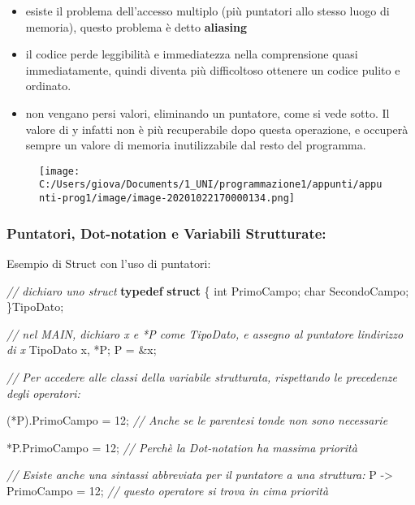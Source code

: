 \documentclass[
]{article}
\newenvironment{Shaded}{}{}
\newcommand{\CommentTok}[1]{\textcolor[rgb]{0.38,0.63,0.69}{\textit{#1}}}
\newcommand{\DataTypeTok}[1]{\textcolor[rgb]{0.56,0.13,0.00}{#1}}
\newcommand{\DecValTok}[1]{\textcolor[rgb]{0.25,0.63,0.44}{#1}}
\newcommand{\KeywordTok}[1]{\textcolor[rgb]{0.00,0.44,0.13}{\textbf{#1}}}
\newcommand{\NormalTok}[1]{#1}
\begin{document}
\begin{itemize}
\item
  esiste il problema dell'accesso multiplo (più puntatori allo stesso
  luogo di memoria), questo problema è detto \textbf{aliasing}
\item
  il codice perde leggibilità e immediatezza nella comprensione quasi
  immediatamente, quindi diventa più difficoltoso ottenere un codice
  pulito e ordinato.
\item
  non vengano persi valori, eliminando un puntatore, come si vede sotto.
  Il valore di y infatti non è più recuperabile dopo questa operazione,
  e occuperà sempre un valore di memoria inutilizzabile dal resto del
  programma.
\end{itemize}

\begin{figure}
\centering
\texttt{[image: C:/Users/giova/Documents/1\_UNI/programmazione1/appunti/appunti-prog1/image/image-20201022170000134.png]}
\caption{}
\end{figure}

\hypertarget{header-n691}{%
\subsubsection{Puntatori, Dot-notation e Variabili
Strutturate:}\label{header-n691}}

Esempio di Struct con l'uso di puntatori:

\begin{Shaded}
\begin{Highlighting}[]
\CommentTok{// dichiaro uno struct}
\KeywordTok{typedef} \KeywordTok{struct}\NormalTok{ \{}
	\DataTypeTok{int}\NormalTok{ PrimoCampo;}
	\DataTypeTok{char}\NormalTok{ SecondoCampo;}
\NormalTok{\}TipoDato;}

\CommentTok{// nel MAIN, dichiaro x e *P come TipoDato, e assegno al puntatore l\textquotesingle{}indirizzo di x}
\NormalTok{TipoDato x, *P;}
\NormalTok{P = \&x;}

\CommentTok{// Per accedere alle classi della variabile strutturata, rispettando le precedenze degli operatori:}

\NormalTok{(*P).PrimoCampo = }\DecValTok{12}\NormalTok{; }\CommentTok{// Anche se le parentesi tonde non sono necessarie}

\NormalTok{*P.PrimoCampo = }\DecValTok{12}\NormalTok{;   }\CommentTok{// Perchè la Dot{-}notation ha massima priorità}

\CommentTok{// Esiste anche una sintassi abbreviata per il puntatore a una struttura:}
\NormalTok{P {-}\textgreater{} PrimoCampo = }\DecValTok{12}\NormalTok{; }\CommentTok{// questo operatore si trova in cima priorità}
\end{Highlighting}
\end{Shaded}
\end{document}
